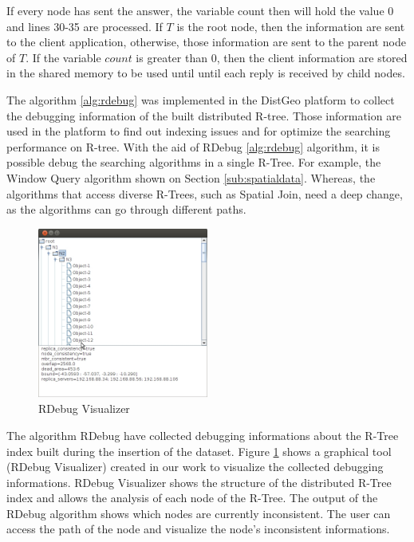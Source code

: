If every node has sent the answer, the variable count then will hold the value 0 and lines 30-35 are processed. 
If $T$ is the root node, then the information are sent to the client application, otherwise, those information are sent to the parent node of $T$. 
If the variable $count$ is greater than 0, then the client information are stored in the shared memory to be used until until each reply is received by child nodes.
	
The algorithm \ref{alg:rdebug} was implemented in the DistGeo platform to collect the debugging information of the built distributed R-tree. 
Those information are used in the platform to find out indexing issues and for optimize the searching performance on R-tree.
With the aid of RDebug \ref{alg:rdebug} algorithm, it is possible debug the searching algorithms in a single R-Tree. 
For example, the Window Query algorithm shown on Section \ref{sub:spatialdata}. 
Whereas, the algorithms that access diverse R-Trees, such as Spatial Join, need a deep change, as the algorithms can go through different paths.

\begin{figure}[ht]
  \centering
  \includegraphics[width=0.5\textwidth]{rdebug-vis.jpg}
  \caption{RDebug Visualizer}
  \label{fig:rdebug-vis}
\end{figure}

The algorithm RDebug have collected debugging informations about the R-Tree index built during the insertion of the dataset.
Figure \ref{fig:rdebug-vis} shows a graphical tool (RDebug Visualizer) created in our work to visualize the collected debugging informations.
RDebug Visualizer shows the structure of the distributed R-Tree index and allows the analysis of each node of the R-Tree.
The output of the RDebug algorithm shows which nodes are currently inconsistent.
The user can access the path of the node and visualize the node's inconsistent informations.    